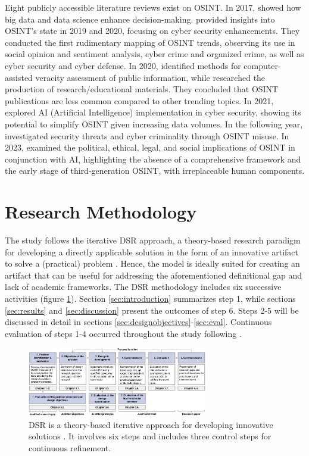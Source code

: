 \documentclass[10pt]{article}
\begin{document}
Eight publicly accessible literature reviews exist on OSINT. In 2017, \cite{DosPassos.2017} showed how big data and data science enhance decision-making. \cite{PastorGalindo.2019, PastorGalindo.2020}
provided insights into OSINT's state in 2019 and 2020, focusing on cyber security
enhancements. They conducted the first rudimentary mapping of OSINT trends, observing its use in social opinion and sentiment
analysis, cyber crime and organized crime, as well as cyber security and cyber defense. In 2020, \cite{GarciaLozano.2020} identified methods for computer-assisted veracity assessment of public information, while
\cite{HerreraCubides.2020} researched the production of research/educational materials. They concluded that OSINT
publications are less common compared to other trending topics. In 2021, \cite{Yogish.2021} explored AI (Artificial Intelligence) implementation in cyber security,
showing its potential to simplify OSINT given increasing data volumes. In the following year,
\cite{Hwang.2022} investigated security threats and cyber criminality through OSINT misuse.
In 2023, \cite{Ghioni.2023} examined the political, ethical, legal, and social implications of
OSINT in conjunction with AI, highlighting the absence of a comprehensive framework and the early stage of third-generation OSINT, with irreplaceable human components.

\section{Research Methodology}

The study follows the iterative DSR approach, a theory-based research paradigm for developing a directly applicable solution in the form of an innovative artifact \cite{vomBrocke.2020b}
to solve a (practical) problem \cite{Peffers.2007}. Hence, the model is ideally suited for creating an artifact that can be useful for addressing the aforementioned definitional gap and lack of academic frameworks. The DSR methodology includes
six successive activities \cite{Peffers.2007} (figure \ref{fig: DSRM}). Section \ref{sec:introduction} summarizes step 1, while sections \ref{sec:results} and \ref{sec:discussion} present the outcomes of step 6. Steps 2-5 will be discussed in detail in sections \ref{sec:designobjectives}-\ref{sec:eval}. Continuous evaluation of steps 1-4 occurred throughout the study following \cite{Sonnenberg.2012}.

\begin{figure}[thb]
    \centering
    \includegraphics[width=0.7\textwidth]{PDF/images/cropped DSR_V01.pdf}
    \caption{DSR is a theory-based iterative approach for developing innovative solutions \cite{Peffers.2007}. It involves six steps \cite{Peffers.2007} and includes three control steps \cite{Sonnenberg.2012} for continuous refinement.}
    \label{fig: DSRM}
\end{figure}
\end{document}

